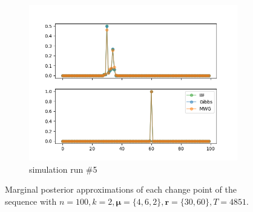 \begin{figure}[H]
\begin{subfigure}{.3\textwidth}
    	\includegraphics[width=\linewidth]{../../plots/Posterior_post_burnin_M3_N100_NMCMC3_seed4_diffind2.png}
    	\caption{simulation run \#5}
	\end{subfigure}
	\caption{Marginal posterior approximations of each change point of the sequence with $n=100, k=2, \bm{\mu}=\{4,6,2\}, \bm{r}=\{30,60\}, T=4851$.}
\end{figure}

